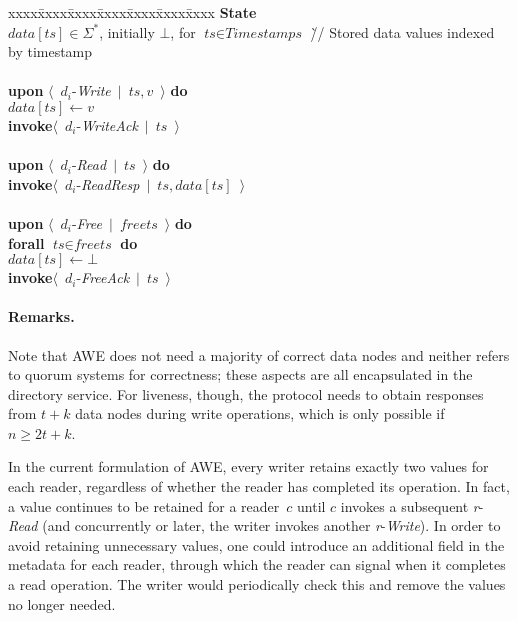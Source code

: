 \documentclass[oribibl]{llncs}
\theoremstyle{definition-boldhead}
\newcommand{\var}[1]{\textit{#1}}
\newcommand{\op}[1]{\textsl{#1}}
\newcommand{\newe}{{\bf invoke}\xspace}
\newcommand{\eventt}[3]{$\langle$~{\var{#1}}-\textsl{#2}~$\mid$~{#3}~$\rangle$}
\newcommand{\becomes}{\ensuremath{\leftarrow}}
\newcommand{\strings}{\ensuremath{\Sigma^{*}}}
\newcommand{\NAME}{AWE\xspace}
\newcommand{\node}{node\xspace}
\newcommand{\nodes}{nodes\xspace}
\begin{document}
\if\submit\no

\begin{alg}\small
\begin{tabbing}
  xxxx\=xxxx\=xxxx\=xxxx\=xxxx\=xxxx\=xxxx\kill
  \textbf{State} \\
  \> $\var{data}[\var{ts}] \in \strings$, initially $\bot$,
     for $\var{ts} \in \var{Timestamps}$
     \` // Stored data values indexed by timestamp \\
  \\
  \textbf{upon} \eventt{$d_i$}{Write}{$\var{ts}, v$} \textbf{do} \\
  \> $\var{data}[\var{ts}] \becomes v$\\
  \> \newe \eventt{$d_i$}{WriteAck}{$\var{ts}$}\\
  \\
  \textbf{upon} \eventt{$d_i$}{Read}{$\var{ts}$} \textbf{do} \\
  \> \newe \eventt{$d_i$}{ReadResp}{$\var{ts}, \var{data}[\var{ts}]$} \\
  \\
  \textbf{upon} \eventt{$d_i$}{Free}{$\var{freets}$} \textbf{do}\\
  \> \textbf{forall} $\var{ts} \in \var{freets}$ \textbf{do} \\
  \> \> $\var{data}[\var{ts}] \becomes \bot$ \\
  \> \newe \eventt{$d_i$}{FreeAck}{$\var{ts}$}
\end{tabbing}
\caption{Protocol~\NAME, implementation of data \node~$d_i$.}
\label{alg:datareplica}
\end{alg}

\fi




\if\submit\no

\paragraph{Remarks.}

Note that \NAME does not need a majority of correct data \nodes and
neither refers to quorum systems for correctness; these aspects are
all encapsulated in the directory service.  For liveness, though, the
protocol needs to obtain responses from $t+k$ data \nodes during write
operations, which is only possible if $n \geq 2t+k$.

In the current formulation of \NAME, every writer retains exactly two
values for each reader, regardless of whether the reader has completed
its operation.  In fact, a value continues to be retained
for a reader~$c$ until $c$ invokes a subsequent \var{r}-\op{Read} (and
concurrently or later, the writer invokes another \var{r}-\op{Write}).
In order to avoid retaining unnecessary values, one could introduce an
additional field in the metadata for each reader, through which the
reader can signal when it completes a read operation.  The writer
would periodically check this and remove the values no longer needed.
\end{document}
